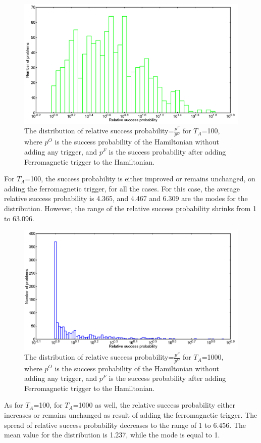 \documentclass[12]{article}
\begin{document}
\begin{figure}[H]
\centering 
\includegraphics[scale=0.3]{Hist_s12_T100_g2.png}
\caption{The distribution of relative success probability=$\frac{p^F}{p^O}$ for $T_A$=100, where $p^O$ is the success probability of the Hamiltonian without adding any trigger, and $p^F$ is the success probability after adding Ferromagnetic trigger to the Hamiltonian.}
\label{fig:f5}
\end{figure}
For $T_A$=100, the success probability is either improved or remains unchanged, on adding the ferromagnetic trigger, for all the cases. For this case, the average relative success probability is 4.365, and 4.467 and 6.309 are the modes for the distribution. However, the range of the relative success probability shrinks from 1 to 63.096.
\begin{figure}[H]
\centering 
\includegraphics[scale=0.3]{Hist_s12_T1000_g2.png}
\caption{The distribution of relative success probability=$\frac{p^F}{p^O}$ for $T_A$=1000, where $p^O$ is the success probability of the Hamiltonian without adding any trigger, and $p^F$ is the success probability after adding Ferromagnetic trigger to the Hamiltonian.}
\label{fig:f6}
\end{figure}
As for $T_A$=100, for $T_A$=1000 as well, the relative success probability either increases or remains unchanged as result of adding the ferromagnetic trigger. The spread of relative success probability decreases to the range of 1 to 6.456. The mean value for the distribution is 1.237, while the mode is equal to 1. \\
\end{document}
